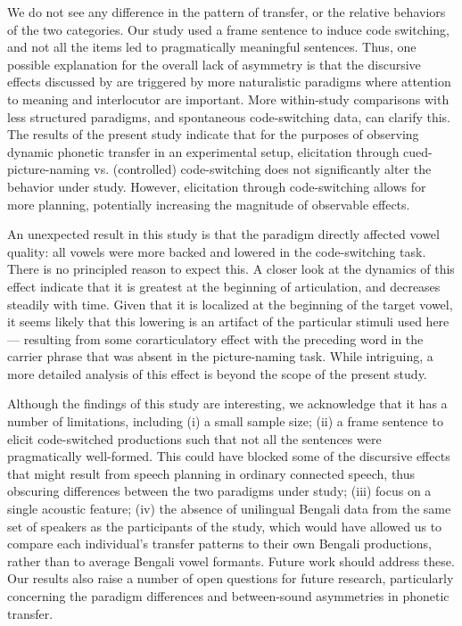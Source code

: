 \documentclass[12 pt]{article}
\begin{document}
We do not see any difference in the pattern of transfer, or the relative behaviors of the two categories. Our study used a frame sentence to induce code switching, and not all the items led to pragmatically meaningful sentences. Thus, one possible explanation for the overall lack of asymmetry is that the discursive effects discussed by \cite{olson2013bilingual} are triggered by more naturalistic paradigms where attention to meaning and interlocutor are important. More within-study comparisons with less structured paradigms, and spontaneous code-switching data, can clarify this. The results of the present study indicate that for the purposes of observing dynamic phonetic transfer in an experimental setup, elicitation through cued-picture-naming vs. (controlled) code-switching does not significantly alter the behavior under study. However, elicitation through code-switching allows for more planning, potentially increasing the magnitude of observable effects. 

An unexpected result in this study is that the paradigm directly affected vowel quality: all vowels were more backed and lowered in the code-switching task. There is no principled reason to expect this. A closer look at the dynamics of this effect indicate that it is greatest at the beginning of articulation, and decreases steadily with time. Given that it is localized at the beginning of the target vowel, it seems likely that this lowering is an artifact of the particular stimuli used here--- resulting from some corarticulatory effect with the preceding word in the carrier phrase that was absent in the picture-naming task. While intriguing, a more detailed analysis of this effect is beyond the scope of the present study.  

Although the findings of this study are interesting, we acknowledge that it has a number of limitations, including (i) a small sample size; (ii) a frame sentence to elicit code-switched productions such that not all the sentences were pragmatically well-formed. This could have blocked some of the discursive effects that might result from speech planning in ordinary connected speech, thus obscuring differences between the two paradigms under study; (iii) focus on a single acoustic feature; (iv) the absence of unilingual Bengali data from the same set of speakers as the participants of the study, which would have allowed us to compare each individual's transfer patterns to their own Bengali productions, rather than to average Bengali vowel formants. Future work should address these. Our results also raise a number of open questions for future research, particularly concerning the paradigm differences and between-sound asymmetries in phonetic transfer.   
\end{document}
